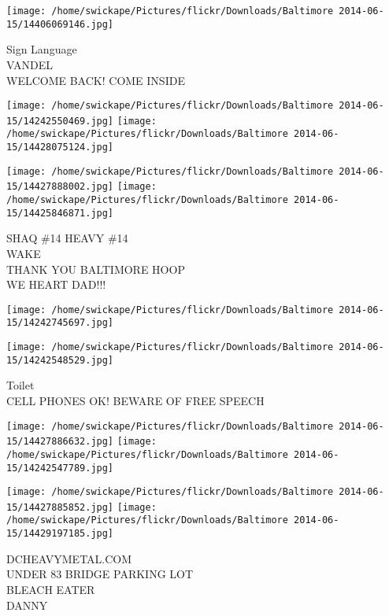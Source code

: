 \documentclass[10pt,letterpaper]{article}
\begin{document}
\vspace{0.25in}
\texttt{[image: /home/swickape/Pictures/flickr/Downloads/Baltimore 2014-06-15/14406069146.jpg]}

Sign Language\\
VANDEL\\
WELCOME BACK!  COME INSIDE\\
\pagebreak

\texttt{[image: /home/swickape/Pictures/flickr/Downloads/Baltimore 2014-06-15/14242550469.jpg]}
\texttt{[image: /home/swickape/Pictures/flickr/Downloads/Baltimore 2014-06-15/14428075124.jpg]}

\texttt{[image: /home/swickape/Pictures/flickr/Downloads/Baltimore 2014-06-15/14427888002.jpg]}
\texttt{[image: /home/swickape/Pictures/flickr/Downloads/Baltimore 2014-06-15/14425846871.jpg]}

SHAQ \#14 HEAVY \#14\\
WAKE\\
THANK YOU BALTIMORE HOOP\\
WE HEART DAD!!!\\
\pagebreak

\texttt{[image: /home/swickape/Pictures/flickr/Downloads/Baltimore 2014-06-15/14242745697.jpg]}

\vspace{0.25in}
\texttt{[image: /home/swickape/Pictures/flickr/Downloads/Baltimore 2014-06-15/14242548529.jpg]}

Toilet\\
CELL PHONES OK!  BEWARE OF FREE SPEECH\\
\pagebreak

\texttt{[image: /home/swickape/Pictures/flickr/Downloads/Baltimore 2014-06-15/14427886632.jpg]}
\texttt{[image: /home/swickape/Pictures/flickr/Downloads/Baltimore 2014-06-15/14242547789.jpg]}

\texttt{[image: /home/swickape/Pictures/flickr/Downloads/Baltimore 2014-06-15/14427885852.jpg]}
\texttt{[image: /home/swickape/Pictures/flickr/Downloads/Baltimore 2014-06-15/14429197185.jpg]}

DCHEAVYMETAL.COM\\
UNDER 83 BRIDGE PARKING LOT\\
BLEACH EATER\\
DANNY\\
\pagebreak
\end{document}
